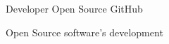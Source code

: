 

\begin{cventries}

  \cventry
    {Developer} %
    {Open Source} %
    {GitHub} %
    {} %
    {
      \begin{cvitems} %
        \item {Open Source software's development}
      \end{cvitems}
    }


\end{cventries}
